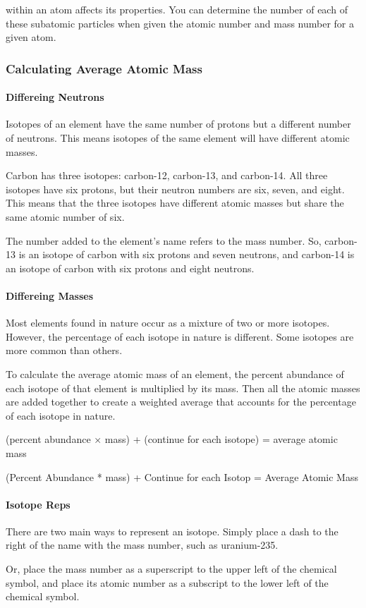 within an atom affects its properties. You can determine the number of each of
these subatomic particles when given the atomic number and mass number for a
given atom.

\subsubsection*{Calculating Average Atomic Mass}

\paragraph{Differeing Neutrons} Isotopes of an element have the same number of
protons but a different number of neutrons. This means isotopes of the same
element will have different atomic masses.

Carbon has three isotopes: carbon-12, carbon-13, and carbon-14. All three
isotopes have six protons, but their neutron numbers are six, seven, and eight.
This means that the three isotopes have different atomic masses but share the
same atomic number of six.

The number added to the element's name refers to the mass number. So, carbon-13
is an isotope of carbon with six protons and seven neutrons, and carbon-14 is an
isotope of carbon with six protons and eight neutrons.

\paragraph{Differeing Masses} Most elements found in nature occur as a mixture
of two or more isotopes. However, the percentage of each isotope in nature is
different. Some isotopes are more common than others.

To calculate the average atomic mass of an element, the percent abundance of
each isotope of that element is multiplied by its mass. Then all the atomic
masses are added together to create a weighted average that accounts for the
percentage of each isotope in nature.

(percent abundance × mass) + (continue for each isotope) = average atomic mass


(Percent Abundance * mass) + Continue for each Isotop = Average Atomic Mass

\paragraph{Isotope Reps} There are two main ways to represent an isotope. Simply
place a dash to the right of the name with the mass number, such as uranium-235.

Or, place the mass number as a superscript to the upper left of the chemical
symbol, and place its atomic number as a subscript to the lower left of the
chemical symbol.

\newpage
